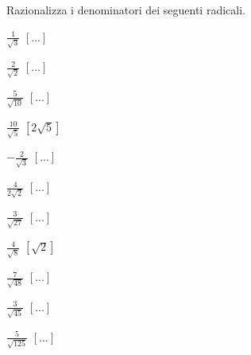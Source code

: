 

\subsubsection*{}

\begin{esercizio}[\Ast]
 \label{ese:2.68}
Razionalizza i denominatori dei seguenti radicali.
 \begin{multicols}{4}
 \begin{enumeratea}
 \item $\frac 1{\sqrt 3}$
  \hfill $\left[...\right]$
 \item $\frac 2{\sqrt 2}$
  \hfill $\left[...\right]$
 \item $\frac 5{\sqrt{10}}$
  \hfill $\left[...\right]$
 \item $\frac{10}{\sqrt 5}$
  \hfill $\left[2\sqrt 5\right]$
 \item $-\frac 2{\sqrt 3}$
  \hfill $\left[...\right]$
 \item $\frac 4{2\sqrt 2}$
  \hfill $\left[...\right]$
 \item $\frac 3{\sqrt{27}}$
  \hfill $\left[...\right]$
 \item $\frac 4{\sqrt 8}$
  \hfill $\left[\sqrt 2\right]$
 \item $\frac 7{\sqrt{48}}$
  \hfill $\left[...\right]$
 \item $\frac 3{\sqrt{45}}$
  \hfill $\left[...\right]$
 \item $\frac 5{\sqrt{125}}$
  \hfill $\left[...\right]$

\end{enumeratea}
\end{multicols}
\end{esercizio}
